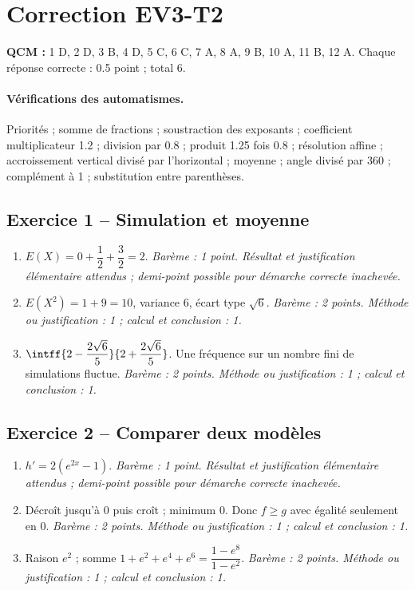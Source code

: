\mxnewpage\section*{Correction EV3-T2}\label{EV3-T2-CORR}
\textbf{QCM :} 1 D, 2 D, 3 B, 4 D, 5 C, 6 C, 7 A, 8 A, 9 B, 10 A, 11 B, 12 A. Chaque réponse correcte : \num{0,5} point ; total 6.
\paragraph{Vérifications des automatismes.} Priorités ; somme de fractions ; soustraction des exposants ; coefficient multiplicateur \num{1,2} ; division par \num{0,8} ; produit \num{1,25} fois \num{0,8} ; résolution affine ; accroissement vertical divisé par l’horizontal ; moyenne ; angle divisé par 360 ; complément à 1 ; substitution entre parenthèses.
\subsection*{Exercice 1 -- Simulation et moyenne}
\begin{enumerate}
\item $E(X)=0+\dfrac{1}{2}+\dfrac{3}{2}=2$. \textit{Barème : 1 point. Résultat et justification élémentaire attendus ; demi-point possible pour démarche correcte inachevée.}
\item $E(X^2)=1+9=10$, variance 6, écart type $\sqrt6$. \textit{Barème : 2 points. Méthode ou justification : 1 ; calcul et conclusion : 1.}
\item $\intff{2-\dfrac{2\sqrt 6}{5}}{2+\dfrac{2\sqrt 6}{5}}$. Une fréquence sur un nombre fini de simulations fluctue. \textit{Barème : 2 points. Méthode ou justification : 1 ; calcul et conclusion : 1.}
\end{enumerate}
\subsection*{Exercice 2 -- Comparer deux modèles}
\begin{enumerate}
\item $h\prime=2(e^{2x}-1)$. \textit{Barème : 1 point. Résultat et justification élémentaire attendus ; demi-point possible pour démarche correcte inachevée.}
\item Décroît jusqu’à 0 puis croît ; minimum 0. Donc $f\geq g$ avec égalité seulement en 0. \textit{Barème : 2 points. Méthode ou justification : 1 ; calcul et conclusion : 1.}
\item Raison $e^2$ ; somme $1+e^2+e^4+e^6=\dfrac{1-e^8}{1-e^2}$. \textit{Barème : 2 points. Méthode ou justification : 1 ; calcul et conclusion : 1.}
\end{enumerate}
